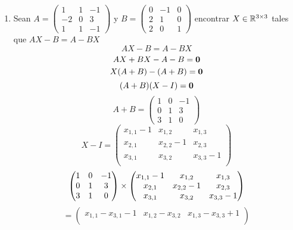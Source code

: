 \documentclass[../practica.root.tex]{subfiles}
\begin{document}
\begin{enumerate}
    \item Sean $A = \begin{pmatrix}
              1  & 1 & -1 \\
              -2 & 0 & 3  \\
              1  & 1 & -1
          \end{pmatrix}$ y $B = \begin{pmatrix}
              0 & -1 & 0 \\
              2 & 1  & 0 \\
              2 & 0  & 1
          \end{pmatrix}$ encontrar $X \in \mathbb{R}^{3\times3}$ tales que $AX - B = A - BX$
          \[ AX - B = A - BX \]
          \[ AX + BX - A - B = \mathbf{0} \]
          \[ X(A + B) - (A + B) = \mathbf{0} \]
          \[ (A + B)(X - I) = \mathbf{0} \]
          \[
              A + B = \begin{pmatrix}
                  1 & 0 & -1 \\
                  0 & 1 & 3  \\
                  3 & 1 & 0
              \end{pmatrix}
          \] \[
              X - I = \begin{pmatrix}
                  x_{1,1}-1 & x_{1,2}   & x_{1,3}   \\
                  x_{2,1}   & x_{2,2}-1 & x_{2,3}   \\
                  x_{3,1}   & x_{3,2}   & x_{3,3}-1 \\
              \end{pmatrix}
          \] \[
              \begin{pmatrix}
                  1 & 0 & -1 \\
                  0 & 1 & 3  \\
                  3 & 1 & 0  \\
              \end{pmatrix}
              \times
              \begin{pmatrix}
                  x_{1,1}-1 & x_{1,2}   & x_{1,3}   \\
                  x_{2,1}   & x_{2,2}-1 & x_{2,3}   \\
                  x_{3,1}   & x_{3,2}   & x_{3,3}-1 \\
              \end{pmatrix}
          \] \[
              =
              \begin{pmatrix}
                  x_{1,1} - x_{3,1} - 1    & x_{1,2} - x_{3,2}      & x_{1,3} - x_{3,3} + 1    \\

\end{pmatrix}\]
\end{enumerate}
\end{document}

